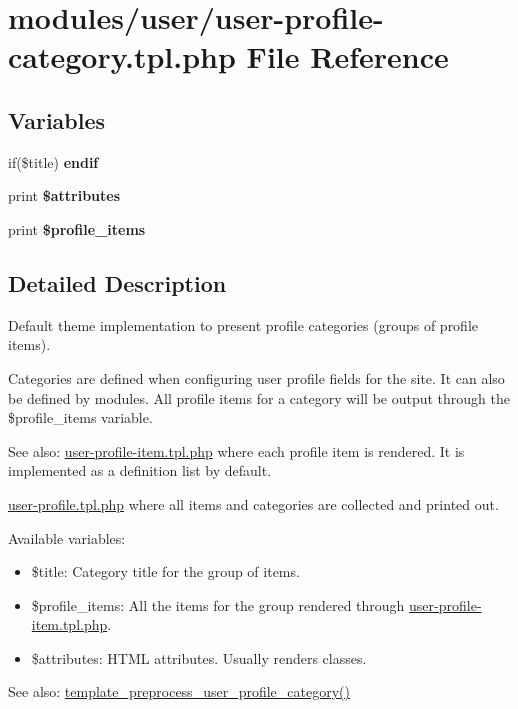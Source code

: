 \hypertarget{user-profile-category_8tpl_8php}{
\section{modules/user/user-profile-category.tpl.php File Reference}
\label{user-profile-category_8tpl_8php}
}
\subsection*{Variables}
\begin{CompactItemize}
\item 
\hypertarget{user-profile-category_8tpl_8php_a9240680e3cbd38bd81f4a04400b4b1a}{
if(\$title) \textbf{endif}}
\label{user-profile-category_8tpl_8php_a9240680e3cbd38bd81f4a04400b4b1a}

\item 
\hypertarget{user-profile-category_8tpl_8php_9c88c4272fa40546577b45392a0b3cd3}{
print \textbf{\$attributes}}
\label{user-profile-category_8tpl_8php_9c88c4272fa40546577b45392a0b3cd3}

\item 
\hypertarget{user-profile-category_8tpl_8php_4e552bb6a277c7ba559bc5d42be75b41}{
print \textbf{\$profile\_\-items}}
\label{user-profile-category_8tpl_8php_4e552bb6a277c7ba559bc5d42be75b41}

\end{CompactItemize}


\subsection{Detailed Description}
Default theme implementation to present profile categories (groups of profile items).

Categories are defined when configuring user profile fields for the site. It can also be defined by modules. All profile items for a category will be output through the \$profile\_\-items variable.

\begin{Desc}
\item[See also:]\hyperlink{user-profile-item_8tpl_8php}{user-profile-item.tpl.php} where each profile item is rendered. It is implemented as a definition list by default. 

\hyperlink{user-profile_8tpl_8php}{user-profile.tpl.php} where all items and categories are collected and printed out.\end{Desc}
Available variables:\begin{itemize}
\item \$title: Category title for the group of items.\item \$profile\_\-items: All the items for the group rendered through \hyperlink{user-profile-item_8tpl_8php}{user-profile-item.tpl.php}.\item \$attributes: HTML attributes. Usually renders classes.\end{itemize}


\begin{Desc}
\item[See also:]\hyperlink{user_8pages_8inc_0b8961894318ad623017b48569515d4a}{template\_\-preprocess\_\-user\_\-profile\_\-category()} \end{Desc}
